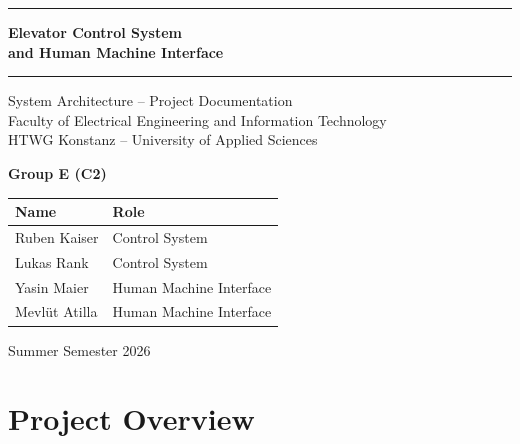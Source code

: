 \documentclass[12pt,a4paper]{article}
\begin{document}

\begin{titlepage}
\thispagestyle{empty}
\begin{center}

\vspace*{2cm}

\rule{\linewidth}{1.5pt}
\vspace{0.5cm}

{\Huge\bfseries Elevator Control System}\\[0.5cm]
{\Large\bfseries and Human Machine Interface}

\vspace{0.4cm}
\rule{\linewidth}{1.5pt}

\vspace{1.5cm}

{\large System Architecture -- Project Documentation}\\[0.3cm]
{\normalsize Faculty of Electrical Engineering and Information Technology}\\[0.2cm]
{\normalsize HTWG Konstanz -- University of Applied Sciences}

\vspace{2.5cm}

{\large\bfseries Group E (C2)}

\vspace{1cm}

\begin{tabular}{ll}
\toprule
\textbf{Name} & \textbf{Role} \\
\midrule
Ruben Kaiser      & Control System \\
Lukas Rank        & Control System \\
Yasin Maier       & Human Machine Interface \\
Mevl\"{u}t Atilla & Human Machine Interface \\
\bottomrule
\end{tabular}

\vfill

{\normalsize Summer Semester 2026}

\end{center}
\end{titlepage}

\newpage
\thispagestyle{empty}
\tableofcontents
\newpage

\section{Project Overview}
\end{document}
